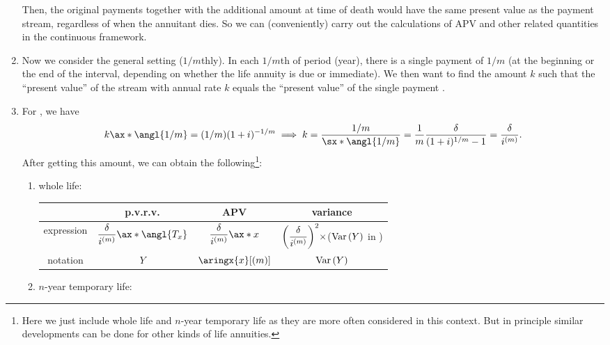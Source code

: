\begin{enumerate}
Then, the original payments  together with the
additional amount at time of death would have the same present value as the
payment stream, regardless of when the annuitant dies. So we can (conveniently)
carry out the calculations of APV and other related quantities in the
continuous framework.

\item Now we consider the general setting (\(1/m\)thly). In each \(1/m\)th of
period (year), there is a single payment  of \(1/m\)
(at the beginning or the end of the interval, depending on whether the life
annuity is due or immediate). We then want to find the amount \(k\) such that
the ``present value'' of the stream with annual rate \(k\) equals the ``present
value'' of the single payment .

\item \label{it:complete-1m-annuity-fmlas}
For , we have
\[
k\ax*{\angl{1/m}}=(1/m)(1+i)^{-1/m}
\implies
k=\frac{1/m}{\sx*{\angl{1/m}}}
=\frac{1}{m}\frac{\delta}{(1+i)^{1/m}-1}
=\frac{\delta}{i^{(m)}}.
\]
After getting this amount, we can obtain the following\footnote{Here we just
include whole life and \(n\)-year temporary life as they are more often
considered in this context. But in principle similar developments can be done
for other kinds of life annuities.}:
\begin{enumerate}
\item whole life:

\begin{tabular}{cccc}
\toprule
&p.v.r.v.&APV&variance\\
\midrule
expression&\(\displaystyle \frac{\delta}{i^{(m)}}\ax*{\angl{T_x}}\)
&\(\displaystyle \frac{\delta}{i^{(m)}}\ax*{x}\)
&\(\displaystyle \qty(\frac{\delta}{i^{(m)}})^2\times\)(\(\operatorname{Var}\qty(Y)\) in {it:cts-wl-annuity-fmlas})\\
notation&\(Y\)&\(\aringx{x}[(m)]\)&\(\operatorname{Var}\qty(Y)\)\\
\bottomrule
\end{tabular}

\item \(n\)-year temporary life:


\end{enumerate}
\end{enumerate}
